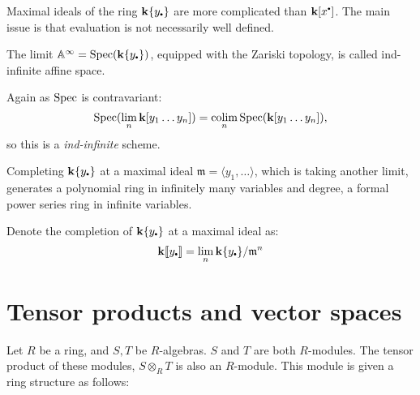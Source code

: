     Maximal ideals of the ring \( \mathbf{k}\{y_{\sbt} \}\) are more complicated than \( \mathbf{k}[x^{\sbt}]\). The main issue is that evaluation is not necessarily well defined.
    
    
    \begin{defn}
    The limit \( \mathbb{A}^{\infty} =  \Spec(\mathbf{k} \{ y_{\sbt} \}) \), equipped with the Zariski topology, is called ind-infinite affine space.
    \end{defn}

    Again as \( \mathrm{Spec}\) is contravariant:
    \[\mathrm{Spec}( \lim_n \mathbf{k}[y_1 \dots y_n]) = \operatorname*{colim}_n \mathrm{Spec}( \mathbf{k}[y_1 \dots y_n]),\]
    so this is a \emph{ind-infinite} scheme.

    

    
    
    
    Completing \(\mathbf{k}\{y_{\sbt}\}\) at a maximal ideal \( \mathfrak{m} = \langle y_1, \dots \rangle \), which is taking another limit, generates a polynomial ring in infinitely many variables and degree, a formal power series ring in infinite variables.
    

    
    \begin{defn}
    Denote the completion of \( \mathbf{k} \{ y_{\sbt} \}\) at a maximal ideal as:
    \[ \mathbf{k}\lBrack y_{\sbt} \rBrack = \lim_n \mathbf{k} \{ y_{\sbt} \}/\mathfrak{m}^n \]
    \end{defn}

    \section{Tensor products and vector spaces}
    
    Let \(R\) be a ring, and \(S,T\) be \(R\)-algebras.
    \(S\) and \(T\) are both \(R\)-modules. The tensor product of these modules, \( S\otimes_R T\) is also an \(R\)-module. This module is given a ring structure as follows:
    
